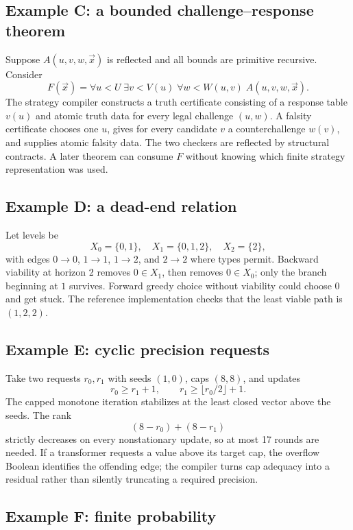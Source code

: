 \subsection{Example C: a bounded challenge--response theorem}

Suppose \(A(u,v,w,\vec x)\) is reflected and all bounds are primitive recursive.  Consider
\[
 F(\vec x)=\forall u<U\;\exists v<V(u)\;\forall w<W(u,v)\;A(u,v,w,\vec x).
\]
The strategy compiler constructs a truth certificate consisting of a response table \(v(u)\) and atomic truth data for every legal challenge \((u,w)\).  A falsity certificate chooses one \(u\), gives for every candidate \(v\) a counterchallenge \(w(v)\), and supplies atomic falsity data.  The two checkers are reflected by structural contracts.  A later theorem can consume \(F\) without knowing which finite strategy representation was used.

\subsection{Example D: a dead-end relation}

Let levels be
\[
 X_0=\{0,1\},\quad X_1=\{0,1,2\},\quad X_2=\{2\},
\]
with edges \(0\to0\), \(1\to1\), \(1\to2\), and \(2\to2\) where types permit.  Backward viability at horizon 2 removes \(0\in X_1\), then removes \(0\in X_0\); only the branch beginning at \(1\) survives.  Forward greedy choice without viability could choose \(0\) and get stuck.  The reference implementation checks that the least viable path is \((1,2,2)\).

\subsection{Example E: cyclic precision requests}

Take two requests \(r_0,r_1\) with seeds \((1,0)\), caps \((8,8)\), and updates
\[
 r_0\ge r_1+1,
 \qquad
 r_1\ge \lfloor r_0/2\rfloor+1.
\]
The capped monotone iteration stabilizes at the least closed vector above the seeds.  The rank
\[
 (8-r_0)+(8-r_1)
\]
strictly decreases on every nonstationary update, so at most 17 rounds are needed.  If a transformer requests a value above its target cap, the overflow Boolean identifies the offending edge; the compiler turns cap adequacy into a residual rather than silently truncating a required precision.

\subsection{Example F: finite probability}


